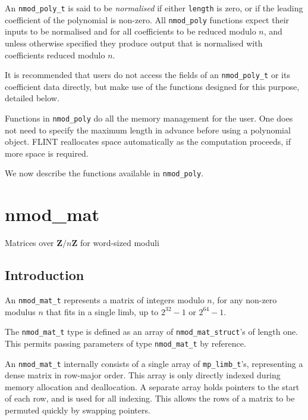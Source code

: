 \documentclass[a4paper,10pt]{book}
\newcommand{\Z}{\mathbf{Z}}%
\newcommand{\code}{\lstinline}
\begin{document}
An \code{nmod_poly_t} is said to be \emph{normalised} if either 
\code{length} is zero, or if the leading coefficient of the polynomial is 
non-zero.  All \code{nmod_poly} functions expect their inputs to be 
normalised and for all coefficients to be reduced modulo $n$, and unless 
otherwise specified they produce output that is normalised with 
coefficients reduced modulo $n$.

It is recommended that users do not access the fields of an 
\code{nmod_poly_t} or its coefficient data directly, but make use of the 
functions designed for this purpose, detailed below.

Functions in \code{nmod_poly} do all the memory management for the user. 
One does not need to specify the maximum length in advance before using a 
polynomial object.  FLINT reallocates space automatically as the computation 
proceeds, if more space is required. 

We now describe the functions available in \code{nmod_poly}.




\chapter{nmod\_mat}
\epigraph{Matrices over $\Z / n \Z$ for word-sized moduli}{}

\section{Introduction}

An \code{nmod_mat_t} represents a matrix of integers modulo $n$, for any 
non-zero modulus $n$ that fits in a single limb,
up to $2^{32}-1$ or $2^{64}-1$.

The \code{nmod_mat_t} type is defined as an array of
\code{nmod_mat_struct}'s of length one.
This  permits passing parameters of type \code{nmod_mat_t}
by reference.

An \code{nmod_mat_t} internally consists of a single array of
\code{mp_limb_t}'s, representing a dense matrix in row-major order.
This array is only directly indexed during memory allocation and
deallocation. A separate array holds pointers to the start of each
row, and is used for all indexing. This allows the rows of a matrix
to be permuted quickly by swapping pointers.
\end{document}
